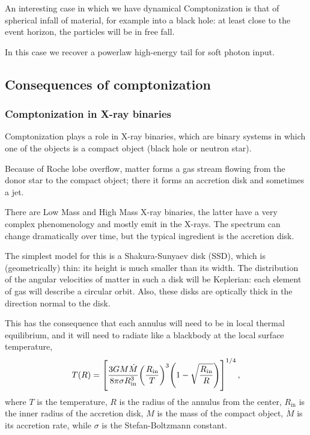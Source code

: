 \documentclass[main.tex]{subfiles}
\begin{document}

An interesting case in which we have dynamical Comptonization is that of spherical infall of material, for example into a black hole: at least close to the event horizon, the particles will be in free fall. 

In this case we recover a powerlaw high-energy tail for soft photon input.

\subsection{Consequences of comptonization}

\subsubsection{Comptonization in X-ray binaries}

Comptonization plays a role in X-ray binaries, which are binary systems in which one of the objects is a compact object (black hole or neutron star).

Because of Roche lobe overflow, matter forms a gas stream flowing from the donor star to the compact object; there it forms an accretion disk and sometimes a jet. 

There are Low Mass and High Mass X-ray binaries, the latter have a very complex phenomenology and mostly emit in the X-rays. 
The spectrum can change dramatically over time, but the typical ingredient is the accretion disk. 

The simplest model for this is a Shakura-Sunyaev disk (SSD), which is (geometrically) thin: its height is much smaller than its width.
The distribution of the angular velocities of matter in such a disk will be Keplerian: each element of gas will describe a circular orbit. 
Also, these disks are optically thick in the direction normal to the disk. 

This has the consequence that each annulus will need to be in local thermal equilibrium, and it will need to radiate like a blackbody at the local surface temperature, 
%
\begin{align}
T(R) = \qty[\frac{3 GM \dot{M}}{8 \pi \sigma R _{\text{in}}^3 } \qty( \frac{R _{\text{in}}}{T})^{3} \qty(1 - \sqrt{\frac{R _{\text{in}}}{R}})]^{1/4}
\,,
\end{align}
%
where \(T\) is the temperature, \(R\) is the radius of the annulus from the center, \(R _{\text{in}}\) is the inner radius of the accretion disk, \(M\) is the mass of the compact object, \(\dot{M}\) is its accretion rate, while \(\sigma \) is the Stefan-Boltzmann constant. 
\end{document}
